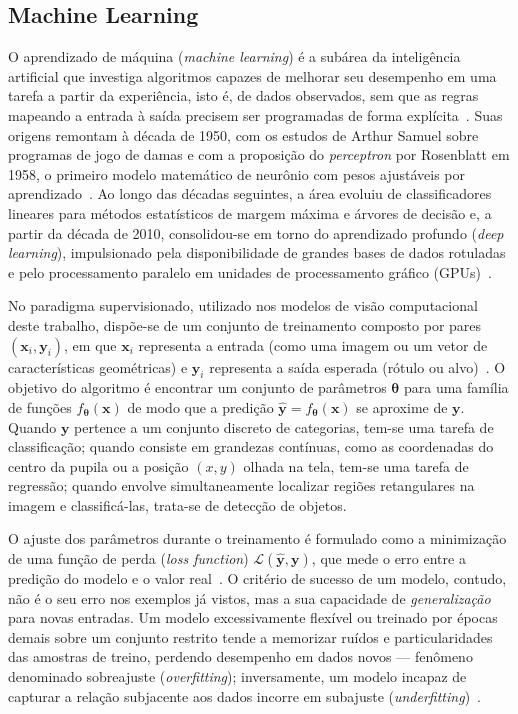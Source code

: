 \subsection{Machine Learning} \label{sec:ml}

O aprendizado de máquina (\textit{machine learning}) é a subárea da inteligência artificial que investiga algoritmos capazes de melhorar seu desempenho em uma tarefa a partir da experiência, isto é, de dados observados, sem que as regras mapeando a entrada à saída precisem ser programadas de forma explícita~\cite{mitchell1997machine}. Suas origens remontam à década de 1950, com os estudos de Arthur Samuel sobre programas de jogo de damas e com a proposição do \textit{perceptron} por Rosenblatt em 1958, o primeiro modelo matemático de neurônio com pesos ajustáveis por aprendizado~\cite{rosenblatt1958perceptron}. Ao longo das décadas seguintes, a área evoluiu de classificadores lineares para métodos estatísticos de margem máxima e árvores de decisão e, a partir da década de 2010, consolidou-se em torno do aprendizado profundo (\textit{deep learning}), impulsionado pela disponibilidade de grandes bases de dados rotuladas e pelo processamento paralelo em unidades de processamento gráfico (GPUs)~\cite{lecun2015deep,goodfellow2016deep}.

No paradigma supervisionado, utilizado nos modelos de visão computacional deste trabalho, dispõe-se de um conjunto de treinamento composto por pares $(\mathbf{x}_i, \mathbf{y}_i)$, em que $\mathbf{x}_i$ representa a entrada (como uma imagem ou um vetor de características geométricas) e $\mathbf{y}_i$ representa a saída esperada (rótulo ou alvo)~\cite{goodfellow2016deep}. O objetivo do algoritmo é encontrar um conjunto de parâmetros $\boldsymbol{\theta}$ para uma família de funções $f_{\boldsymbol{\theta}}(\mathbf{x})$ de modo que a predição $\hat{\mathbf{y}} = f_{\boldsymbol{\theta}}(\mathbf{x})$ se aproxime de $\mathbf{y}$. Quando $\mathbf{y}$ pertence a um conjunto discreto de categorias, tem-se uma tarefa de classificação; quando consiste em grandezas contínuas, como as coordenadas do centro da pupila ou a posição $(x, y)$ olhada na tela, tem-se uma tarefa de regressão; quando envolve simultaneamente localizar regiões retangulares na imagem e classificá-las, trata-se de detecção de objetos.

O ajuste dos parâmetros durante o treinamento é formulado como a minimização de uma função de perda (\textit{loss function}) $\mathcal{L}(\hat{\mathbf{y}}, \mathbf{y})$, que mede o erro entre a predição do modelo e o valor real~\cite{goodfellow2016deep}. O critério de sucesso de um modelo, contudo, não é o seu erro nos exemplos já vistos, mas a sua capacidade de \textit{generalização} para novas entradas. Um modelo excessivamente flexível ou treinado por épocas demais sobre um conjunto restrito tende a memorizar ruídos e particularidades das amostras de treino, perdendo desempenho em dados novos --- fenômeno denominado sobreajuste (\textit{overfitting}); inversamente, um modelo incapaz de capturar a relação subjacente aos dados incorre em subajuste (\textit{underfitting})~\cite{goodfellow2016deep}.


